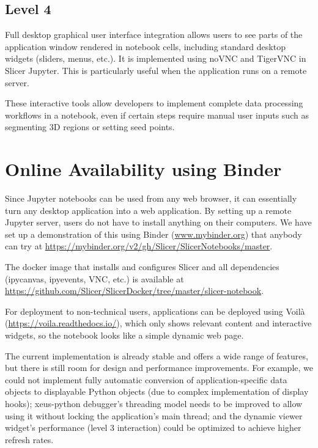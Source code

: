 \documentclass{IEEEcsmag}
\begin{document}
\subsection{Level 4}

Full desktop graphical user interface integration allows users to see parts of the application window rendered in notebook cells, including standard desktop widgets (sliders, menus, etc.). It is implemented using noVNC and TigerVNC in Slicer Jupyter. This is particularly useful when the application runs on a remote server.

These interactive tools allow developers to implement complete data processing workflows in a notebook, even if certain steps require manual user inputs such as segmenting 3D regions or setting seed points.


\section{Online Availability using Binder}

Since Jupyter notebooks can be used from any web browser, it can essentially turn any desktop application into a web application. By setting up a remote Jupyter server, users do not have to install anything on their computers. We have set up a demonstration of this using Binder (\url{www.mybinder.org}) that anybody can try at \url{https://mybinder.org/v2/gh/Slicer/SlicerNotebooks/master}.

The docker image that installs and configures Slicer and all dependencies (ipycanvas, ipyevents, VNC, etc.) is available at \url{https://github.com/Slicer/SlicerDocker/tree/master/slicer-notebook}.

For deployment to non-technical users, applications can be deployed using Voilà (\url{https://voila.readthedocs.io/}), which only shows relevant content and interactive widgets, so the notebook looks like a simple dynamic web page.

The current implementation is already stable and offers a wide range of features, but there is still room for design and performance improvements. For example, we could not implement fully automatic conversion of application-specific data objects to displayable Python objects (due to complex implementation of display hooks); xeus-python debugger’s threading model needs to be improved to allow using it without locking the application’s main thread; and the dynamic viewer widget’s performance (level 3 interaction) could be optimized to achieve higher refresh rates.
\end{document}
